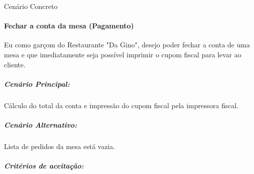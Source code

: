 \begin{itemize}
\begin{description}
  \item [Cenário Concreto]

\end{description} 

\end{itemize}

\paragraph{Fechar a conta da mesa (Pagamento)}

Eu como garçom do Restaurante "Da Gino", desejo poder fechar a conta de uma mesa e que imediatamente seja possível imprimir o cupom fiscal para levar ao cliente.

\subparagraph{Cenário Principal:}

Cálculo do total da conta e impressão do cupom fiscal pela impressora fiscal.

\subparagraph{Cenário Alternativo:}

Lista de pedidos da mesa está vazia.

\subparagraph{Critérios de aceitação:}

